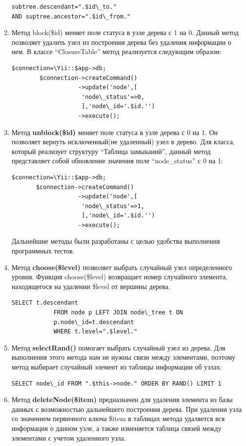 \documentclass[a4paper,14pt]{extreport}
\theoremstyle{definition}
\begin{document}
\begin{enumerate}
\begin{verbatim}
subtree.descendant=".$id\_to."
AND suptree.ancestor=".$id\_from."\end{verbatim}
\item Метод block(\$id) меняет поле статуса в узле дерева с 1 на 0. Данный метод позволяет удалить узел из построения дерева без удаления информации о нем. В классе “ClosureTable” метод реализуется следующим образом:
\begin{verbatim}$connection=\Yii::$app->db;
        $connection->createCommand()
                   ->update('node',[
                    'node\_status'=>0,
                    ],'node\_id='.$id.'')
                   ->execute();\end{verbatim}
\item Метод \textbf{unblock(\$id)} меняет поле статуса в узле дерева с 0 на 1. Он позволяет вернуть исключенный(не удаленный) узел в дерево. Для класса, который реализует структуру “Таблица замыканий”, данный метод представляет собой обновление значения поле “node\_status” с 0 на 1:
\begin{verbatim}$connection=\Yii::$app->db;
       $connection->createCommand()
                   ->update('node',[
                    'node\_status'=>1,
                    ],'node\_id='.$id.'')
                   ->execute();\end{verbatim}
Дальнейшие методы были разработаны с целью удобства выполнения программных тестов.
\item Метод \textbf{choose(\$level)} позволяет выбрать случайный узел определенного уровня. Функция choose(\$level) возвращает номер случайного элемента, находящегося на удалении \$level от вершины дерева.
\begin{verbatim}SELECT t.descendant
			FROM node p LEFT JOIN node\_tree t ON
			p.node\_id=t.descendant
			WHERE t.level=".$level."\end{verbatim}
\item  Метод \textbf{selectRand()} помогает выбрать случайный узел из дерева. Для выполнения этого метода нам не нужны связи между элементами, поэтому метод выбирает случайный элемент из таблицы информации об узлах:
\begin{verbatim}SELECT node\_id FROM ".$this->node." ORDER BY RAND() LIMIT 1 \end{verbatim}
\item Метод \textbf{deleteNode(\$item)} предназначен для удаления элемента из базы данных с возможностью дальнейшего построения дерева.
При удалении узла со значением первичного ключа \$item в таблицах метода удаляется вся информация о данном узле, а также изменяется таблица связей между элементами с учетом удаленного узла.
\end{enumerate}
\end{document}
